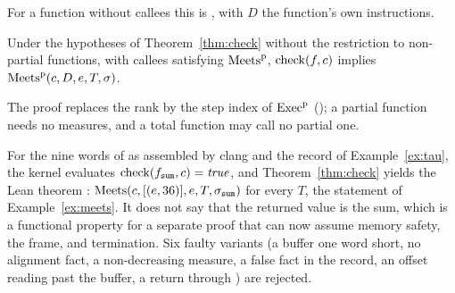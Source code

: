 For a function without callees this is , with $D$ the function's own instructions.

\begin{claim}\label{thm:checkp}
Under the hypotheses of Theorem~\ref{thm:check} without the restriction to non-partial functions, with callees satisfying $\mathrm{Meets}^{\mathrm{p}}$, $\mathrm{check}(f,c)$ implies $\mathrm{Meets}^{\mathrm{p}}(c,D,e,T,\sigma)$.
\end{claim}
The proof replaces the rank by the step index of $\mathrm{Exec}^{\mathrm p}$ (); a partial function needs no measures, and a total function may call no partial one.

\begin{example}\label{ex:final}
For the nine words of  as assembled by clang and the record of Example~\ref{ex:tau}, the kernel evaluates $\mathrm{check}(f_{\mathtt{sum}},c)=\mathit{true}$, and Theorem~\ref{thm:check} yields the Lean theorem : $\mathrm{Meets}(c,[(e,36)],e,T,\sigma_{\mathtt{sum}})$ for every $T$, the statement of Example~\ref{ex:meets}. It does not say that the returned value is the sum, which is a functional property for a separate proof that can now assume memory safety, the frame, and termination. Six faulty variants (a buffer one word short, no alignment fact, a non-decreasing measure, a false fact in the record, an offset reading past the buffer, a return through ) are rejected.
\end{example}


